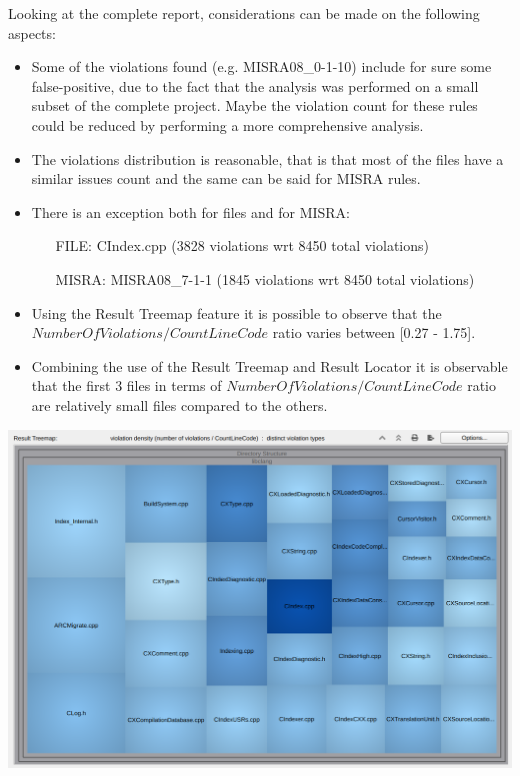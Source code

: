 Looking at the complete report, considerations can be made on the following aspects:

\begin{itemize}
	\item Some of the violations found (e.g. MISRA08\_0-1-10) include for sure some false-positive, due to the fact that the analysis was performed on a small subset of the complete project. Maybe the violation count for these rules could be reduced by performing a more comprehensive analysis.
	\item The violations distribution is reasonable, that is that most of the files have a similar issues count and the same can be said for MISRA rules.
	\item There is an exception both for files and for MISRA:
	\begin{itemize}
		\item[FILE: ] CIndex.cpp (3828 violations wrt 8450 total violations)
		\item[MISRA: ] MISRA08\_7-1-1 (1845 violations wrt 8450 total violations)
	\end{itemize}
	\item Using the Result Treemap feature it is possible to observe that the $NumberOfViolations/CountLineCode$ ratio varies between [0.27 - 1.75].
	\item Combining the use of the Result Treemap and Result Locator it is observable that the first 3 files in terms of $NumberOfViolations/CountLineCode$ ratio are relatively small files compared to the others.
	
\end{itemize}

\vspace{1cm}

\begin{minipage}{\linewidth}
	\includegraphics[width=\textwidth]{img/TreemapCountLine.png}
\end{minipage}
\pagebreak

